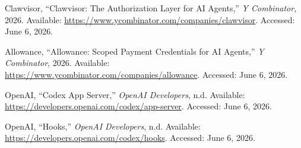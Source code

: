 \documentclass[11pt]{article}
\begin{document}
\begin{sloppypar}
\begin{enumerate}[label={[\arabic*]},leftmargin=*]
  \item Clawvisor, ``Clawvisor: The Authorization Layer for AI Agents,''
  \textit{Y Combinator}, 2026. Available:
  \url{https://www.ycombinator.com/companies/clawvisor}.
  Accessed: June 6, 2026.

  \item Allowance, ``Allowance: Scoped Payment Credentials for AI Agents,''
  \textit{Y Combinator}, 2026. Available:
  \url{https://www.ycombinator.com/companies/allowance}.
  Accessed: June 6, 2026.

  \item OpenAI, ``Codex App Server,'' \textit{OpenAI Developers}, n.d.
  Available: \url{https://developers.openai.com/codex/app-server}.
  Accessed: June 6, 2026.

  \item OpenAI, ``Hooks,'' \textit{OpenAI Developers}, n.d.
  Available: \url{https://developers.openai.com/codex/hooks}.
  Accessed: June 6, 2026.
\end{enumerate}
\end{sloppypar}
\end{document}
